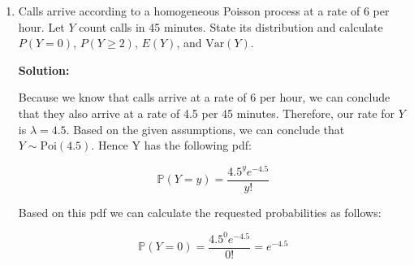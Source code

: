 \documentclass[11pt]{article}
\newcommand{\solution}{\par\medskip\noindent\textbf{Solution:}\par\vspace{0cm}}
\begin{document}
\begin{enumerate}[label=\textbf{(\alph*)}]
  Let $x_i \sim \text{Ber}(0.25) \quad \forall i \in \{1, 2, \dots, 8\}$. Thus, by definition we have that for any patient i, $P(x_i = 1) = 0.25$, and $P(x_i = 0) = 0.75$.

  Hence, it follows that 

  \[
  X = \sum_{i = 1}^{8} x_i
  \]

  To derive the mean and variance of X, we can first consider the expectation of each $x_i$:

  \[
  \mathbb{E}x_i = 1P(x_i = 1) + 0P(x_i = 0) = 0.25
  \]

  Hence, because each patient is independent, and we know that the expectation of the sum of independent random variables is just the sum of each individual expectation, we have:

  \[
  \mathbb{E}X = \mathbb{E}[\sum_{i = 1}^{8} x_i] = \sum_{i = 1}^{8} \mathbb{E}[x_i] = \sum_{i = 1}^{8} 0.25 = 8*0.25 = 2
  \]

  Similarly,

  \[
  \mathbb{E}x^2_i = 1^2P(x_i = 1) + 0^2P(x_i = 0) = 0.25
  \]

  \[
  \text{Var}x_i = \mathbb{E}x^2_i - \mathbb{E}[x_i]^2 = 0.25 - 0.25^2 = 0.25 - 0.0625 = 0.1875
  \]

  Importantly, we know that each $x_i$ is independent, and the variance of the sum of independent random variables is just the sum of their respective variances. Hence:
  \[
  \text{Var}X = \text{Var}[\sum_{i = 1}^{8} x_i] = \sum_{i = 1}^{8} \text{Var}[x_i] = \sum_{i = 1}^{8} 0.1875 = 8*0.1875 = 1.5
  \]
  

  \item Calls arrive according to a homogeneous Poisson process at a rate of 6 per hour. Let $Y$ count calls in 45 minutes. State its distribution and calculate $P(Y = 0)$, $P(Y \geq 2)$, $E(Y)$, and $\text{Var}(Y)$.
  \solution

  Because we know that calls arrive at a rate of 6 per hour, we can conclude that they also arrive at a rate of 4.5 per 45 minutes. Therefore, our rate for $Y$ is $\lambda = 4.5$. Based on the given assumptions, we can conclude that $Y \sim \text{Poi}(4.5)$. Hence Y has the following pdf:

  \[
  \mathbb{P}(Y = y) = \frac{4.5^y e^{-4.5}}{y!}
  \]

  Based on this pdf we can calculate the requested probabilities as follows:

  \[
  \mathbb{P}(Y = 0) = \frac{4.5^0 e^{-4.5}}{0!} = e^{-4.5}
  \]


\end{enumerate}
\end{document}
